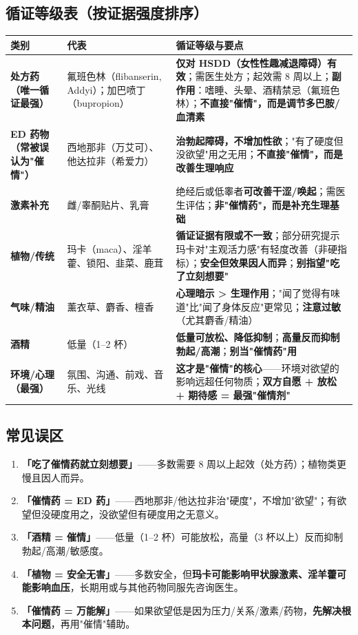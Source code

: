 \documentclass[12pt,UTF8,openany]{ctexbook}
\begin{document}
\subsection*{循证等级表（按证据强度排序）}
\begin{center}
\footnotesize
\begin{tabularx}{\textwidth}{l X X}
\toprule
\textbf{类别} & \textbf{代表} & \textbf{循证等级与要点} \\
\midrule
\textbf{处方药（唯一循证最强）} & 氟班色林（flibanserin, Addyi）；加巴喷丁（bupropion） & \textbf{仅对 HSDD（女性性趣减退障碍）有效}；需医生处方；起效需 8 周以上；\textbf{副作用}：嗜睡、头晕、酒精禁忌（氟班色林）；\textbf{不直接"催情"，而是调节多巴胺/血清素} \\
\textbf{ED 药物（常被误认为"催情"）} & 西地那非（万艾可）、他达拉非（希爱力） & \textbf{治勃起障碍，不增加性欲}；"有了硬度但没欲望"用之无用；\textbf{不直接"催情"，而是改善生理响应} \\
\textbf{激素补充} & 雌/睾酮贴片、乳膏 & 绝经后或低睾者\textbf{可改善干涩/唤起}；需医生评估；\textbf{非"催情药"，而是补充生理基础} \\
\textbf{植物/传统} & 玛卡（maca）、淫羊藿、锁阳、韭菜、鹿茸 & \textbf{循证证据有限或不一致}；部分研究提示玛卡对"主观活力感"有轻度改善（非硬指标）；\textbf{安全但效果因人而异}；\textbf{别指望"吃了立刻想要"} \\
\textbf{气味/精油} & 薰衣草、麝香、檀香 & \textbf{心理暗示 > 生理作用}；"闻了觉得有味道"比"闻了身体反应"更常见；\textbf{注意过敏}（尤其麝香/精油） \\
\textbf{酒精} & 低量（1--2 杯） & \textbf{低量可放松、降低抑制}；\textbf{高量反而抑制勃起/高潮}；\textbf{别当"催情药"用} \\
\textbf{环境/心理（最强）} & 氛围、沟通、前戏、音乐、光线 & \textbf{这才是"催情"的核心}——环境对欲望的影响远超任何物质；\textbf{双方自愿 + 放松 + 期待感 = 最强"催情剂"} \\
\bottomrule
\end{tabularx}
\end{center}

\subsection*{常见误区}
\begin{enumerate}[leftmargin=2em,itemsep=0.3em]
  \item \textbf{「吃了催情药就立刻想要」}——多数需要 8 周以上起效（处方药）；植物类更慢且因人而异。
  \item \textbf{「催情药 = ED 药」}——西地那非/他达拉非治"硬度"，不增加"欲望"；有欲望但没硬度用之，没欲望但有硬度用之无意义。
  \item \textbf{「酒精 = 催情」}——低量（1--2 杯）可能放松，高量（3 杯以上）反而抑制勃起/高潮/敏感度。
  \item \textbf{「植物 = 安全无害」}——多数安全，但\textbf{玛卡可能影响甲状腺激素、淫羊藿可能影响血压}，长期用或与其他药物同服先咨询医生。
  \item \textbf{「催情药 = 万能解」}——如果欲望低是因为压力/关系/激素/药物，\textbf{先解决根本问题}，再用"催情"辅助。
\end{enumerate}
\end{document}
